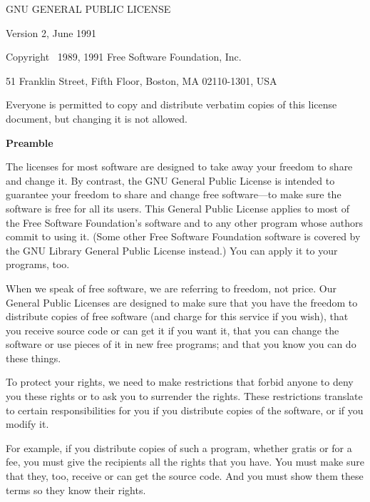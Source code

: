 \newsavebox{\gpl}
\begin{lrbox}{\gpl}
\begin{minipage}{3\textwidth}
\columnsep
\begintriplecolumns
\begincentered
	{\Large GNU GENERAL PUBLIC LICENSE\par}
	\bigskip
	{Version 2, June 1991}

	{\parindent 0in

	Copyright \textcopyright\ 1989, 1991 Free Software Foundation, Inc.

	\bigskip

	51 Franklin Street, Fifth Floor, Boston, MA  02110-1301, USA

	\bigskip

	Everyone is permitted to copy and distribute verbatim copies
	of this license document, but changing it is not allowed.
	}

	{\bf\large Preamble}
\endcentered


The licenses for most software are designed to take away your freedom to
share and change it.  By contrast, the GNU General Public License is
intended to guarantee your freedom to share and change free software---to
make sure the software is free for all its users.  This General Public
License applies to most of the Free Software Foundation's software and to
any other program whose authors commit to using it.  (Some other Free
Software Foundation software is covered by the GNU Library General Public
License instead.)  You can apply it to your programs, too.

When we speak of free software, we are referring to freedom, not price.
Our General Public Licenses are designed to make sure that you have the
freedom to distribute copies of free software (and charge for this service
if you wish), that you receive source code or can get it if you want it,
that you can change the software or use pieces of it in new free programs;
and that you know you can do these things.

To protect your rights, we need to make restrictions that forbid anyone to
deny you these rights or to ask you to surrender the rights.  These
restrictions translate to certain responsibilities for you if you
distribute copies of the software, or if you modify it.

For example, if you distribute copies of such a program, whether gratis or
for a fee, you must give the recipients all the rights that you have.  You
must make sure that they, too, receive or can get the source code.  And
you must show them these terms so they know their rights.


\end{minipage}
\end{lrbox}
